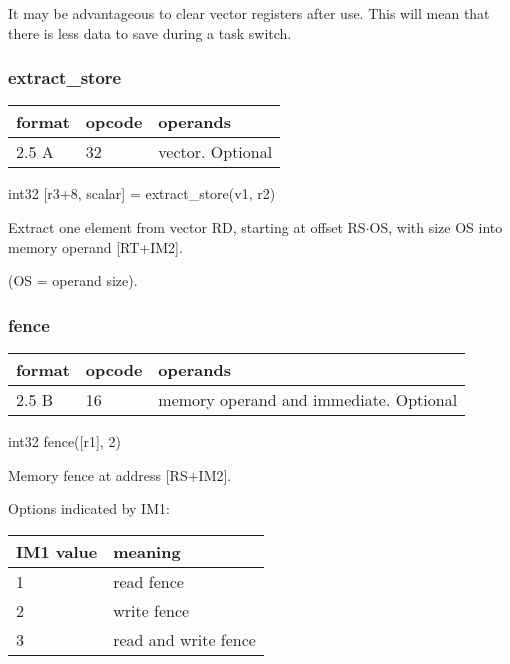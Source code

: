 \documentclass[forwardcom.tex]{subfiles}
\begin{document}
It may be advantageous to clear vector registers after use. This will mean that there is less data to save during a task switch.
\vspace{2mm}


\subsubsection{extract\_store}
\label{table:extractStoreInstruction}
\begin{tabular}{|p{12mm}|p{12mm}|p{110mm}|}
\hline
\bfseries format & \bfseries opcode & \bfseries operands \\ \hline
2.5 A & 32 & vector. Optional \\ \hline
\end{tabular}
\vspace{2mm}

int32 [r3+8, scalar] = extract\_store(v1, r2)
\vspace{2mm}

Extract one element from vector RD, starting at offset RS$\cdot$OS, with size OS into memory operand [RT+IM2].

(OS = operand size).


\subsubsection{fence}
\label{table:fenceInstruction}
\begin{tabular}{|p{12mm}|p{12mm}|p{110mm}|}
\hline
\bfseries format & \bfseries opcode & \bfseries operands \\ \hline
2.5 B & 16 & memory operand and immediate. Optional \\ \hline
\end{tabular}
\vspace{2mm}

int32   fence([r1], 2)
\vspace{2mm}

Memory fence at address [RS+IM2].
\vspace{2mm}

Options indicated by IM1:

\begin{longtable}{|p{20mm}|p{50mm}|}
\endfirsthead
\endhead
\hline
\bfseries IM1 value & \bfseries meaning \\ \hline
1 & read fence \\ \hline
2 & write fence \\ \hline
3 & read and write fence \\ \hline
\end{longtable}
\vspace{2mm}
\end{document}
